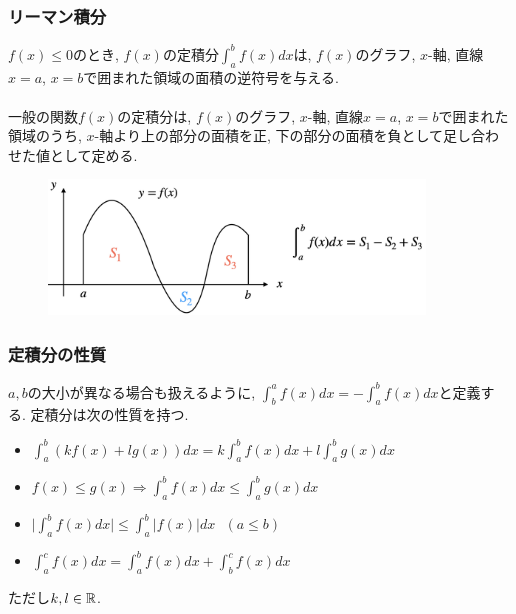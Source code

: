 

\begin{frame}
\frametitle{リーマン積分}


$f(x) \le 0$のとき, $f(x)$の定積分$\int_a^b f(x)dx$は, $f(x)$のグラフ, $x$-軸, 直線$x=a$, $x=b$で囲まれた領域の面積の逆符号を与える. \\
\ \\

一般の関数$f(x)$の定積分は, $f(x)$のグラフ, $x$-軸, 直線$x=a$, $x=b$で囲まれた領域のうち, 
$x$-軸より上の部分の面積を正, 下の部分の面積を負として足し合わせた値として定める. 

\vspace{-1mm}

\begin{figure}[htbp]
 \begin{center} 
  \includegraphics[width=100mm]{calculus12/RiemannInt.png}
 \end{center}
\end{figure}

\vspace{-1mm}

\end{frame}




\begin{frame}
\frametitle{定積分の性質}

$a,b$の大小が異なる場合も扱えるように, $\int_b^a f(x)dx =- \int_a^b f(x)dx$と定義する. 
定積分は次の性質を持つ. 

\begin{itemize}
\item $\displaystyle \int_a^b (k f(x)+l g(x))dx =  k \int_a^b f(x)dx + l \int_a^b g(x)dx$
\item $\displaystyle f(x) \le g(x) \Longrightarrow  \int_a^b f(x)dx \le \int_a^b g(x)dx$
\item $\displaystyle \big| \int_a^b f(x)dx \big| \le \int_a^b |f(x)|dx \ \ \ (a \le b)$
\item $\displaystyle  \int_a^c f(x)dx = \int_a^b f(x)dx + \int_b^c f(x)dx$
\end{itemize}
ただし$k,l \in \mathbb{R}$. 

\end{frame}


